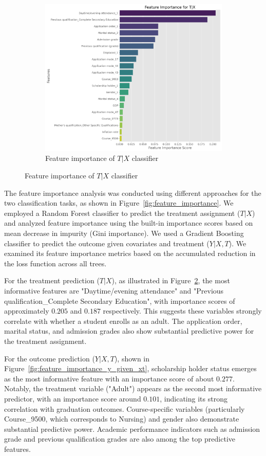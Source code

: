 \documentclass{article}
\begin{document}
\begin{figure}
\begin{subfigure}[b]{0.45\textwidth}
        \includegraphics[width=\textwidth]{plots/feature_importance_t_given_x.png}
        \caption{Feature importance of $T | X$ classifier}
        \label{fig:feature_importance_t_given_x}
    \end{subfigure}
\end{figure}

The feature importance analysis was conducted using different approaches for the two classification tasks, as shown in Figure~\ref{fig:feature_importance}. We employed a Random Forest classifier to predict the treatment assignment ($T|X$) and analyzed feature importance using the built-in importance scores based on mean decrease in impurity (Gini importance). We used a Gradient Boosting classifier to predict the outcome given covariates and treatment ($Y|X, T$). We examined its feature importance metrics based on the accumulated reduction in the loss function across all trees.

For the treatment prediction ($T|X$), as illustrated in Figure~\ref{fig:feature_importance_t_given_x}, the most informative features are "Daytime/evening attendance" and "Previous qualification\_Complete Secondary Education", with importance scores of approximately $0.205$ and $0.187$ respectively. This suggests these variables strongly correlate with whether a student enrolls as an adult. The application order, marital status, and admission grades also show substantial predictive power for the treatment assignment.

For the outcome prediction ($Y|X, T$), shown in Figure~\ref{fig:feature_importance_y_given_xt}, scholarship holder status emerges as the most informative feature with an importance score of about $0.277$. Notably, the treatment variable ("Adult") appears as the second most informative predictor, with an importance score around $0.101$, indicating its strong correlation with graduation outcomes. Course-specific variables (particularly Course\_9500, which corresponds to Nursing) and gender also demonstrate substantial predictive power. Academic performance indicators such as admission grade and previous qualification grades are also among the top predictive features.
\end{document}
